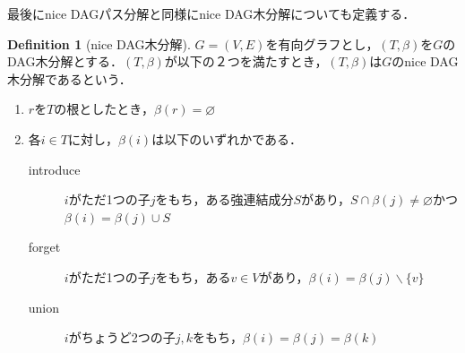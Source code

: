 \documentclass[master]{kuisthesis}		%
\theoremstyle{plain}
\theoremstyle{definition}
\newtheorem{definition*}{Definition}
\begin{document}
最後にnice DAGパス分解と同様にnice DAG木分解についても定義する．

\begin{definition*}[nice DAG木分解]
 $G=(V, E)$を有向グラフとし，$(T, \beta)$を$G$のDAG木分解とする．$(T, \beta)$が以下の２つを満たすとき，$(T, \beta)$は$G$のnice DAG木分解であるという．
 
\begin{enumerate}
    \item $r$を$T$の根としたとき，$\beta(r) = \varnothing$ 
    \item 各$i \in T$に対し，$\beta(i)$は以下のいずれかである．
    \begin{description}
          \item[introduce] $i$がただ1つの子$j$をもち，ある強連結成分$S$があり，$S \cap \beta(j) \neq \varnothing$かつ$\beta(i) = \beta(j) \cup S$
          \item[forget] $i$がただ1つの子$j$をもち，ある$v \in V$があり，$\beta(i) = \beta(j) \backslash \{v\}$
          \item[union] $i$がちょうど2つの子$j, k$をもち，$\beta(i) = \beta(j) = \beta(k)$
    \end{description}
    \end{enumerate}
\end{definition*}

\end{document}
